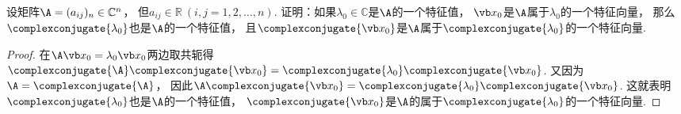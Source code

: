 \begin{example}
设矩阵\(\A = (a_{ij})_n \in \mathbb{C}^n\)，
但\(a_{ij} \in \mathbb{R}\ (i,j=1,2,\dotsc,n)\).
证明：如果\(\lambda_0\in\mathbb{C}\)是\(\A\)的一个特征值，
\(\x_0\)是\(\A\)属于\(\lambda_0\)的一个特征向量，
那么\(\complexconjugate{\lambda_0}\)也是\(\A\)的一个特征值，
且\(\complexconjugate{\x_0}\)是\(\A\)属于\(\complexconjugate{\lambda_0}\)的一个特征向量.
\begin{proof}
在\(\A\x_0=\lambda_0\x_0\)两边取共轭得
\(\complexconjugate{\A}\complexconjugate{\x_0}
=\complexconjugate{\lambda_0}\complexconjugate{\x_0}\).
又因为\(\A=\complexconjugate{\A}\)，
因此\(\A\complexconjugate{\x_0}=\complexconjugate{\lambda_0}\complexconjugate{\x_0}\).
这就表明\(\complexconjugate{\lambda_0}\)也是\(\A\)的一个特征值，
\(\complexconjugate{\x_0}\)是\(\A\)的属于\(\complexconjugate{\lambda_0}\)的一个特征向量.
\end{proof}
\end{example}

